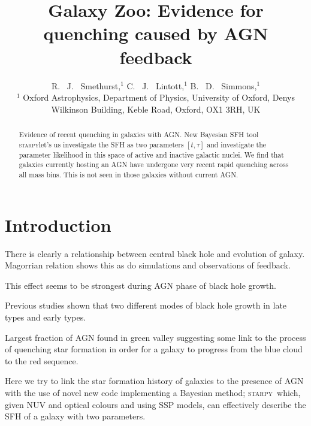 \documentclass[useAMS,usenatbib]{mn2e}
\def\starpy {\textsc{starpy}}
\begin{document}
\title[Quenching by AGN]{Galaxy Zoo: Evidence for quenching caused by AGN feedback}
\author[Smethurst et al. 2014]{R. ~J. ~Smethurst,$^{1}$ C. ~J. ~Lintott,$^{1}$ B. ~D. ~Simmons,$^{1}$
\\ $^1$ Oxford Astrophysics, Department of Physics, University of Oxford, Denys Wilkinson Building, Keble Road, Oxford, OX1 3RH, UK 
\\
}

\maketitle

\begin{abstract}
Evidence of recent quenching in galaxies with AGN. New Bayesian SFH tool \starpy let's us investigate the SFH as two parameters $[t, \tau]$ and investigate the parameter likelihood in this space of active and inactive galactic nuclei. We find that galaxies currently hosting an AGN have undergone very recent rapid quenching across all mass bins. This is not seen in those galaxies without current AGN.  \footnotemark[1]

\end{abstract}


\section{Introduction}

There is clearly a relationship between central black hole and evolution of galaxy. Magorrian relation shows this as do simulations and observations of feedback. 

This effect seems to be strongest during AGN phase of black hole growth. 

Previous studies shown that two different modes of black hole growth in late types and early types. 

Largest fraction of AGN found in green valley suggesting some link to the process of quenching star formation in order for a galaxy to progress from the blue cloud to the red sequence. 

Here we try to link the star formation history of galaxies to the presence of AGN with the use of novel new code implementing a Bayesian method; \starpy~which, given NUV and optical colours and using SSP models, can effectively describe the SFH of a galaxy with two parameters. 
\end{document}
